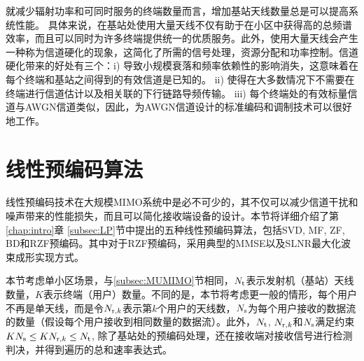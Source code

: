 就减少辐射功率和可同时服务的终端数量而言，增加基站天线数量总是可以提高系统性能。 具体来说，在基站处使用大量天线不仅有助于在小区中获得高的总频谱效率，而且可以同时为许多终端提供统一的优质服务。此外，使用大量天线会产生一种称为信道硬化的现象，这简化了所需的信号处理，资源分配和功率控制。信道硬化带来的好处有三个：i) 导致小规模衰落和频率依赖性的影响消失，这意味着在每个终端和基站之间得到的有效信道是已知的。 ii) 使得在大多数情况下不需要在终端进行信道估计以及相关联的下行链路导频传输。 iii) 每个终端处的有效标量信道与AWGN信道类似，因此，为AWGN信道设计的标准编码和调制技术可以很好地工作。

\section{线性预编码算法}
线性预编码技术在大规模MIMO系统中是必不可少的，其不仅可以减少信道干扰和噪声带来的性能损失，而且可以简化接收端设备的设计。本节将详细介绍了第\ref{chap:intro}章 \ref{subsec:LP}节中提出的五种线性预编码算法，包括SVD, MF, ZF, BD和RZF预编码。其中对于RZF预编码，采用典型的MMSE以及SLNR最大化波束成形实现方式。

本节考虑单小区场景，与\ref{subsec:MUMIMO}节相同，${N_{\rm{t}}}$表示发射机（基站）天线数量，${K}$表示终端（用户）数量。不同的是，本节将考虑更一般的情形，每个用户不再是单天线，而是令${{N_{{\rm{r}},k}}}$表示第${k}$个用户的天线数，${N_{\rm{s}}}$为每个用户接收的数据流的数量（假设每个用户接收到相同数量的数据流）。此外，${N_{\rm{t}}}$, ${{N_{{\rm{r}},k}}}$和${N_{\rm{s}}}$满足约束${K{N_{\rm{s}}} \le K{N_{{\rm{r}},k}} \le {N_{\rm{t}}}}$, 除了基站处的预编码处理，还在接收端对接收信号进行检测判决，并得到遍历的总和速率表达式。
